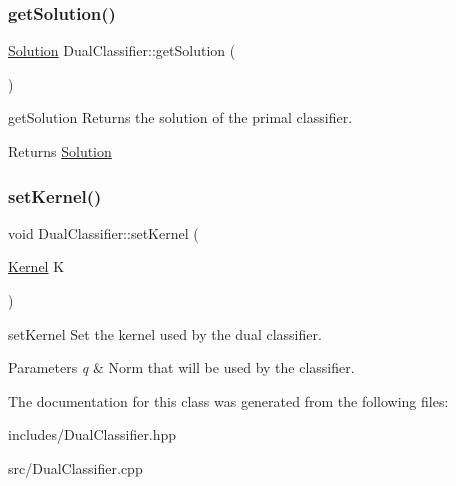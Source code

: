 \subsubsection{\texorpdfstring{get\+Solution()}{getSolution()}}
{\footnotesize\ttfamily \hyperlink{class_solution}{Solution} Dual\+Classifier\+::get\+Solution (\begin{DoxyParamCaption}{ }\end{DoxyParamCaption})}



get\+Solution Returns the solution of the primal classifier. 

\begin{DoxyReturn}{Returns}
\hyperlink{class_solution}{Solution} 
\end{DoxyReturn}
\mbox{\label{class_dual_classifier_a0cf616ad02cfcdd69cfd3d0b35001946}} 
\subsubsection{\texorpdfstring{set\+Kernel()}{setKernel()}}
{\footnotesize\ttfamily void Dual\+Classifier\+::set\+Kernel (\begin{DoxyParamCaption}\item[{\hyperlink{class_kernel}{Kernel}}]{K }\end{DoxyParamCaption})}



set\+Kernel Set the kernel used by the dual classifier. 


\begin{DoxyParams}{Parameters}
{\em q} & Norm that will be used by the classifier. \\
\hline
\end{DoxyParams}


The documentation for this class was generated from the following files\+:\begin{DoxyCompactItemize}
\item 
includes/Dual\+Classifier.\+hpp\item 
src/Dual\+Classifier.\+cpp\end{DoxyCompactItemize}
